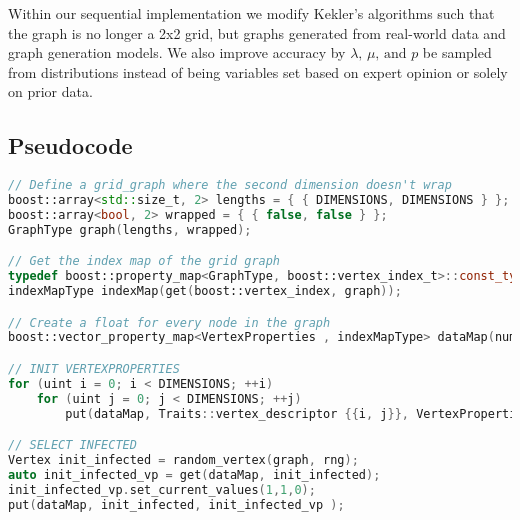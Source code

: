{Within our sequential implementation we modify Kekler's algorithms such that the graph is no longer a 2x2 grid, but graphs generated from real-world data and graph generation models. We also improve accuracy by $\lambda,\,\mu,\,\text{and } p$ be sampled from distributions instead of being variables set based on expert opinion or solely on prior data.

\subsection{Pseudocode}

\begin{lstlisting}[language=C++, caption={Selecting a Vertex to be Infected}]
// Define a grid_graph where the second dimension doesn't wrap
boost::array<std::size_t, 2> lengths = { { DIMENSIONS, DIMENSIONS } };
boost::array<bool, 2> wrapped = { { false, false } };
GraphType graph(lengths, wrapped);

// Get the index map of the grid graph
typedef boost::property_map<GraphType, boost::vertex_index_t>::const_type indexMapType;
indexMapType indexMap(get(boost::vertex_index, graph));

// Create a float for every node in the graph
boost::vector_property_map<VertexProperties , indexMapType> dataMap(num_vertices(graph), indexMap);

// INIT VERTEXPROPERTIES
for (uint i = 0; i < DIMENSIONS; ++i)
	for (uint j = 0; j < DIMENSIONS; ++j)
    	put(dataMap, Traits::vertex_descriptor {{i, j}}, VertexProperties{i,j,1});

// SELECT INFECTED
Vertex init_infected = random_vertex(graph, rng);
auto init_infected_vp = get(dataMap, init_infected);
init_infected_vp.set_current_values(1,1,0);
put(dataMap, init_infected, init_infected_vp );
\end{lstlisting}


}